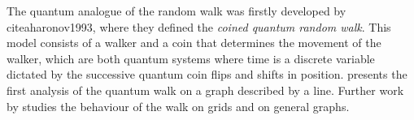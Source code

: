 \documentclass[../../dissertation.tex]{subfiles}
\begin{document}
The quantum analogue of the random walk was firstly developed by
cite{aharonov1993}, where they defined the \textit{coined quantum random walk}.
This model consists of a walker and a coin that determines the movement of the
walker, which are both quantum systems where time is a discrete variable
dictated by the successive quantum coin flips and shifts in position.
\cite{nayak2000} presents the first analysis of the quantum walk on a graph
described by a line. Further work by \cite{inui2003} studies the behaviour of
the walk on grids and \cite{aharonov2002} on general graphs. 
\end{document}

